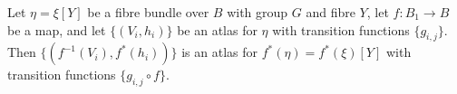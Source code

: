 Let $\eta = \xi[Y]$ be a fibre bundle over $B$ with group $G$ and fibre $Y$, let $f: B_1 \rightarrow B$ be a map, and let $\{(V_i, h_i)\}$ be an atlas for $\eta$ with transition functions $\{g_{i,j}\}$. Then $\{(f^{-1}(V_i), f^*(h_i))\}$ is an atlas for $f^*(\eta) = f^*(\xi)[Y]$ with transition functions $\{g_{i,j} \circ f\}$.
